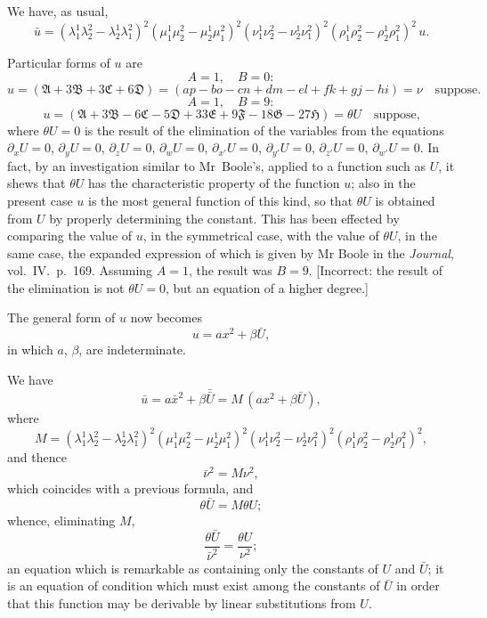 \documentclass[11pt,a4paper]{article}
\theoremstyle{plain}
\theoremstyle{definition}
\theoremstyle{remark}
\begin{document}
We have, as usual,
\[
\bar{u} = (\lambda_1^1\lambda_2^2 - \lambda_2^1\lambda_1^2)^2(\mu_1^1\mu_2^2 - \mu_2^1\mu_1^2)^2(\nu_1^1\nu_2^2 - \nu_2^1\nu_1^2)^2(\rho_1^1\rho_2^2 - \rho_2^1\rho_1^2)^2\,u.
\]

Particular forms of $u$ are
\[
A=1,\quad B=0:
\]
\[
u = (\mathfrak{A} + 3\mathfrak{B} + 3\mathfrak{C} + 6\mathfrak{D}) = (ap - bo - cn + dm - el + fk + gj - hi) = \nu \quad\text{suppose.}
\]
\[
A=1,\quad B=9:
\]
\[
u = (\mathfrak{A} + 3\mathfrak{B} - 6\mathfrak{C} - 5\mathfrak{D} + 33\mathfrak{E} + 9\mathfrak{F} - 18\mathfrak{G} - 27\mathfrak{H}) = \theta U \quad\text{suppose,}
\]
where $\theta U=0$ is the result of the elimination of the variables from the equations
$\partial_x U=0$, $\partial_y U=0$, $\partial_z U=0$, $\partial_w U=0$, $\partial_{x'}U=0$, $\partial_{y'}U=0$, $\partial_{z'}U=0$, $\partial_{w'}U=0$. In fact, by
an investigation similar to Mr~Boole's, applied to a function such as $U$, it shews
that $\theta U$ has the characteristic property of the function $u$; also in the present case
$u$ is the most general function of this kind, so that $\theta U$ is obtained from $U$ by
properly determining the constant. This has been effected by comparing the value of
$u$, in the symmetrical case, with the value of $\theta U$, in the same case, the expanded
expression of which is given by Mr Boole in the \textit{Journal}, vol.\ IV.\ p.\ 169. Assuming
$A=1$, the result was $B=9$. [Incorrect: the result of the elimination is not $\theta U=0$,
but an equation of a higher degree.]

The general form of $u$ now becomes
\[
u = ax^2 + \beta\bar{U},
\]
in which $a$, $\beta$, are indeterminate.

We have
\[
\bar{u} = a\bar{x}^2 + \beta\bar{\bar{U}} = M\,(a x^2 + \beta\bar{U}),
\]
where
\[
M = (\lambda_1^1\lambda_2^2 - \lambda_2^1\lambda_1^2)^2(\mu_1^1\mu_2^2 - \mu_2^1\mu_1^2)^2(\nu_1^1\nu_2^2 - \nu_2^1\nu_1^2)^2(\rho_1^1\rho_2^2 - \rho_2^1\rho_1^2)^2,
\]
and thence
\[
\bar{\nu}^2 = M\nu^2,
\]
which coincides with a previous formula, and
\[
\theta\bar{U} = M\theta U;
\]
whence, eliminating $M$,
\[
\frac{\theta\bar{U}}{\bar{\nu}^2} = \frac{\theta U}{\nu^2};
\]
an equation which is remarkable as containing only the constants of $U$ and $\bar{U}$; it is
an equation of condition which must exist among the constants of $\bar{U}$ in order that
this function may be derivable by linear substitutions from $U$.

\newpage
\end{document}
